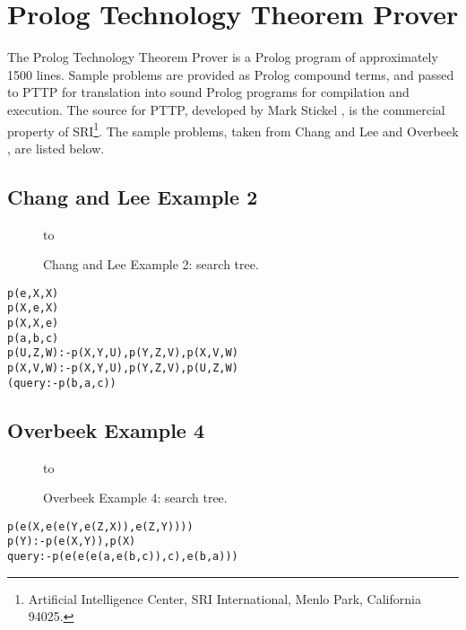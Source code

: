 \section{Prolog Technology Theorem Prover} %
\label{pttp_benchmark}

The Prolog Technology Theorem Prover is a Prolog program of approximately
1500 lines.  Sample problems are provided as Prolog compound terms, and
passed to PTTP for translation into sound Prolog programs for compilation
and execution.  The source for PTTP,
developed by Mark Stickel \cite{Sti88}, is the commercial property of
SRI\footnote{Artificial Intelligence Center, SRI International,
Menlo Park, California 94025.}.  The sample problems, taken from
Chang and Lee \cite{CL73} and Overbeek \cite{DLO87}, are listed below.

\subsection{Chang and Lee Example 2}

\begin{figure}[htb]
\vspace{5mm} \hbox to 
\caption{Chang and Lee Example 2: search tree.}
\vspace{5mm}
\label{cl2_tree}
\end{figure}
\begin{minipage}[h]{\textwidth}  %
\begin{alltt}
                p(e,X,X)
                p(X,e,X)
                p(X,X,e)
                p(a,b,c)
                p(U,Z,W) :- p(X,Y,U) , p(Y,Z,V) , p(X,V,W)
                p(X,V,W) :- p(X,Y,U) , p(Y,Z,V) , p(U,Z,W)
                (query :- p(b,a,c))
\end{alltt}
\end{minipage}

\subsection{Overbeek Example 4}

\begin{figure}[htb]
\vspace{5mm} \hbox to 
\caption{Overbeek Example 4: search tree.}
\vspace{5mm}
\label{over_tree}
\end{figure}
\begin{minipage}[h]{\textwidth}
\begin{alltt}
                p(e(X,e(e(Y,e(Z,X)),e(Z,Y))))
                p(Y) :- p(e(X,Y)), p(X)
                query :- p(e(e(e(a,e(b,c)),c),e(b,a)))
\end{alltt}
\end{minipage}